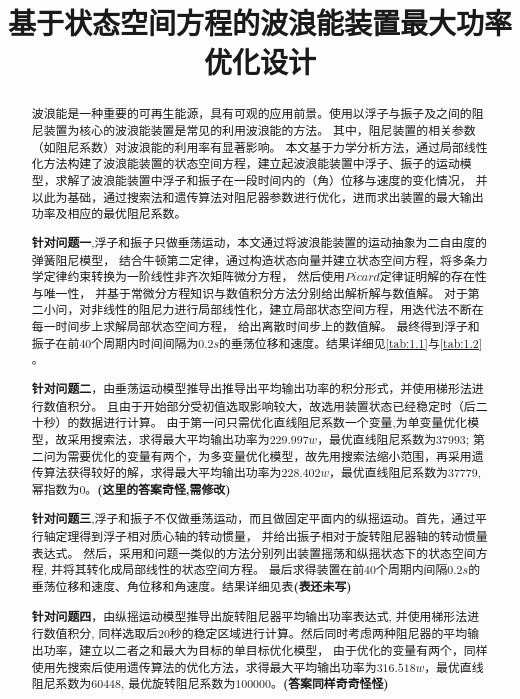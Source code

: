 \documentclass[withoutpreface,bwprint]{cumcmthesis} %
\title{基于状态空间方程的波浪能装置最大功率优化设计}
\begin{document}
    \maketitle
    \begin{abstract}
    波浪能是一种重要的可再生能源，具有可观的应用前景。使用以浮子与振子及之间的阻尼装置为核心的波浪能装置是常见的利用波浪能的方法。
    其中，阻尼装置的相关参数（如阻尼系数）对波浪能的利用率有显著影响。
    本文基于力学分析方法，通过局部线性化方法构建了波浪能装置的状态空间方程，建立起波浪能装置中浮子、振子的运动模型，求解了波浪能装置中浮子和振子在一段时间内的（角）位移与速度的变化情况，
    并以此为基础，通过搜索法和遗传算法对阻尼器参数进行优化，进而求出装置的最大输出功率及相应的最优阻尼系数。
    
    \textbf{针对问题一},浮子和振子只做垂荡运动，本文通过将波浪能装置的运动抽象为二自由度的弹簧阻尼模型，
    结合牛顿第二定律，通过构造状态向量并建立状态空间方程，将多条力学定律约束转换为一阶线性非齐次矩阵微分方程，
    然后使用$Picard$定律证明解的存在性与唯一性，
    并基于常微分方程知识与数值积分方法分别给出解析解与数值解。
    对于第二小问，对非线性的阻尼力进行局部线性化，建立局部状态空间方程，用迭代法不断在每一时间步上求解局部状态空间方程，
    给出离散时间步上的数值解。
    最终得到浮子和振子在前$40$个周期内时间间隔为$0.2s$的垂荡位移和速度。结果详细见\cref{tab:1.1}与\cref{tab:1.2} 。

    \textbf{针对问题二}，由垂荡运动模型推导出推导出平均输出功率的积分形式，并使用梯形法进行数值积分。
    且由于开始部分受初值选取影响较大，故选用装置状态已经稳定时（后二十秒）的数据进行计算。
    由于第一问只需优化直线阻尼系数一个变量,为单变量优化模型，故采用搜索法，求得最大平均输出功率为$229.997w$，最优直线阻尼系数为$37993$;
    第二问为需要优化的变量有两个，为多变量优化模型，故先用搜索法缩小范围，再采用遗传算法获得较好的解，求得最大平均输出功率为$228.402w$，最优直线阻尼系数为$37779$, 幂指数为$0$。\textbf{(这里的答案奇怪,需修改)}

    \textbf{针对问题三},浮子和振子不仅做垂荡运动，而且做固定平面内的纵摇运动。首先，通过平行轴定理得到浮子相对质心轴的转动惯量，
    并给出振子相对于旋转阻尼器轴的转动惯量表达式。
    然后，采用和问题一类似的方法分别列出装置摇荡和纵摇状态下的状态空间方程, 并将其转化成局部线性的状态空间方程。
    最后求得装置在前$40$个周期内间隔$0.2s$的垂荡位移和速度、角位移和角速度。结果详细见表\textbf{(表还未写)}

    \textbf{针对问题四}，由纵摇运动模型推导出旋转阻尼器平均输出功率表达式, 并使用梯形法进行数值积分,
    同样选取后20秒的稳定区域进行计算。然后同时考虑两种阻尼器的平均输出功率，建立以二者之和最大为目标的单目标优化模型，
    由于优化的变量有两个，同样使用先搜索后使用遗传算法的优化方法，求得最大平均输出功率为$316.518w$，最优直线阻尼系数为$60448$, 最优旋转阻尼系数为$100000$。\textbf{(答案同样奇奇怪怪)}
    \end{abstract}
\end{document}
